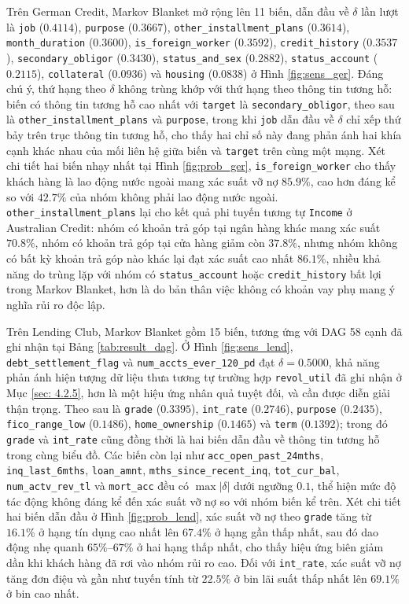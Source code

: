 Trên German Credit, Markov Blanket mở rộng lên 11 biến, dẫn đầu về $\delta$ lần lượt là \texttt{job} ($0.4114$), \texttt{purpose} ($0.3667$), \texttt{other\_installment\_plans} ($0.3614$), \texttt{month\_duration} ($0.3600$), \texttt{is\_foreign\_worker} ($0.3592$), \texttt{credit\_history} ($0.3537$), \texttt{secondary\_obligor} ($0.3430$), \texttt{status\_and\_sex} ($0.2882$), \texttt{status\_account} ($0.2115$), \texttt{collateral} ($0.0936$) và \texttt{housing} ($0.0838$) ở Hình \ref{fig:sens_ger}. Đáng chú ý, thứ hạng theo $\delta$ không trùng khớp với thứ hạng theo thông tin tương hỗ: biến có thông tin tương hỗ cao nhất với \texttt{target} là \texttt{secondary\_obligor}, theo sau là \texttt{other\_installment\_plans} và \texttt{purpose}, trong khi \texttt{job} dẫn đầu về $\delta$ chỉ xếp thứ bảy trên trục thông tin tương hỗ, cho thấy hai chỉ số này đang phản ánh hai khía cạnh khác nhau của mối liên hệ giữa biến và \texttt{target} trên cùng một mạng. Xét chi tiết hai biến nhạy nhất tại Hình \ref{fig:prob_ger}, \texttt{is\_foreign\_worker} cho thấy khách hàng là lao động nước ngoài mang xác suất vỡ nợ $85.9\%$, cao hơn đáng kể so với $42.7\%$ của nhóm không phải lao động nước ngoài. \texttt{other\_installment\_plans} lại cho kết quả phi tuyến tương tự \texttt{Income} ở Australian Credit: nhóm có khoản trả góp tại ngân hàng khác mang xác suất $70.8\%$, nhóm có khoản trả góp tại cửa hàng giảm còn $37.8\%$, nhưng nhóm không có bất kỳ khoản trả góp nào khác lại đạt xác suất cao nhất $86.1\%$, nhiều khả năng do trùng lặp với nhóm có \texttt{status\_account} hoặc \texttt{credit\_history} bất lợi trong Markov Blanket, hơn là do bản thân việc không có khoản vay phụ mang ý nghĩa rủi ro độc lập.

Trên Lending Club, Markov Blanket gồm 15 biến, tương ứng với DAG 58 cạnh đã ghi nhận tại Bảng \ref{tab:result_dag}. Ở Hình \ref{fig:sens_lend}, \texttt{debt\_settlement\_flag} và \texttt{num\_accts\_ever\_120\_pd} đạt $\delta = 0.5000$, khả năng phản ánh hiện tượng dữ liệu thưa tương tự trường hợp \texttt{revol\_util} đã ghi nhận ở Mục \ref{sec: 4.2.5}, hơn là một hiệu ứng nhân quả tuyệt đối, và cần được diễn giải thận trọng. Theo sau là \texttt{grade} ($0.3395$), \texttt{int\_rate} ($0.2746$), \texttt{purpose} ($0.2435$), \texttt{fico\_range\_low} ($0.1486$), \texttt{home\_ownership} ($0.1465$) và \texttt{term} ($0.1392$); trong đó \texttt{grade} và \texttt{int\_rate} cũng đồng thời là hai biến dẫn đầu về thông tin tương hỗ trong cùng biểu đồ. Các biến còn lại như \texttt{acc\_open\_past\_24mths}, \texttt{inq\_last\_6mths}, \texttt{loan\_amnt}, \texttt{mths\_since\_recent\_inq}, \texttt{tot\_cur\_bal}, \texttt{num\_actv\_rev\_tl} và \texttt{mort\_acc} đều có $\max|\delta|$ dưới ngưỡng $0.1$, thể hiện mức độ tác động không đáng kể đến xác suất vỡ nợ so với nhóm biến kể trên. Xét chi tiết hai biến dẫn đầu ở Hình \ref{fig:prob_lend}, xác suất vỡ nợ theo \texttt{grade} tăng từ $16.1\%$ ở hạng tín dụng cao nhất lên $67.4\%$ ở hạng gần thấp nhất, sau đó dao động nhẹ quanh $65\%$--$67\%$ ở hai hạng thấp nhất, cho thấy hiệu ứng biên giảm dần khi khách hàng đã rơi vào nhóm rủi ro cao. Đối với \texttt{int\_rate}, xác suất vỡ nợ tăng đơn điệu và gần như tuyến tính từ $22.5\%$ ở bin lãi suất thấp nhất lên $69.1\%$ ở bin cao nhất.

